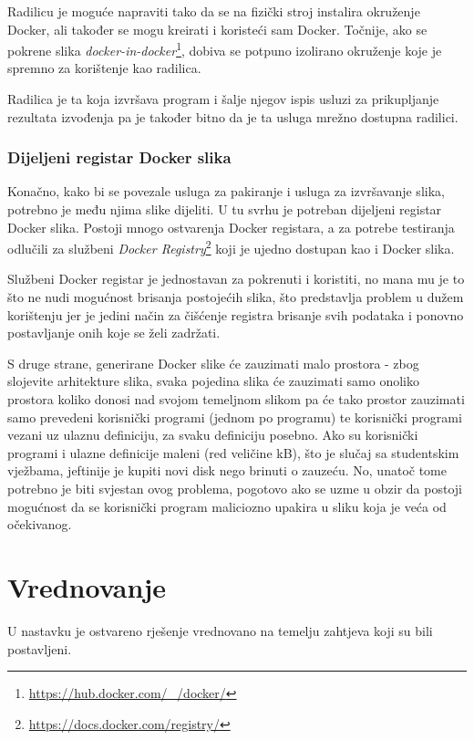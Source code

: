 \documentclass[times, utf8, zavrsni]{fer}
\begin{document}
{Radilicu je moguće napraviti tako da se na fizički stroj instalira okruženje Docker, ali također se mogu kreirati i koristeći sam Docker. Točnije, ako se pokrene slika {\textit{docker-in-docker}}{\footnote{\url{https://hub.docker.com/_/docker/}}}, dobiva se potpuno izolirano okruženje koje je spremno za korištenje kao radilica.

Radilica je ta koja izvršava program i šalje njegov ispis usluzi za prikupljanje rezultata izvođenja pa je također bitno da je ta usluga mrežno dostupna radilici.

\subsection{Dijeljeni registar Docker slika}
\label{sec:dockerregistry}

Konačno, kako bi se povezale usluga za pakiranje i usluga za izvršavanje slika, potrebno je među njima slike dijeliti. U tu svrhu je potreban dijeljeni registar Docker slika. Postoji mnogo ostvarenja Docker registara, a za potrebe testiranja odlučili za službeni {\textit{Docker Registry}}{\footnote{\url{https://docs.docker.com/registry/}}} koji je ujedno dostupan kao i Docker slika.

Službeni Docker registar je jednostavan za pokrenuti i koristiti, no mana mu je to što ne nudi mogućnost brisanja postojećih slika, što predstavlja problem u dužem korištenju jer je jedini način za čišćenje registra brisanje svih podataka i ponovno postavljanje onih koje se želi zadržati.

S druge strane, generirane Docker slike će zauzimati malo prostora - zbog slojevite arhitekture slika, svaka pojedina slika će zauzimati samo onoliko prostora koliko donosi nad svojom temeljnom slikom pa će tako prostor zauzimati samo prevedeni korisnički programi (jednom po programu) te korisnički programi vezani uz ulaznu definiciju, za svaku definiciju posebno. Ako su korisnički programi i ulazne definicije maleni (red veličine kB), što je slučaj sa studentskim vježbama, jeftinije je kupiti novi disk nego brinuti o zauzeću. No, unatoč tome potrebno je biti svjestan ovog problema, pogotovo ako se uzme u obzir da postoji mogućnost da se korisnički program maliciozno upakira u sliku koja je veća od očekivanog.

\chapter{Vrednovanje}

U nastavku je ostvareno rješenje vrednovano na temelju zahtjeva koji su bili postavljeni.

}
\end{document}
